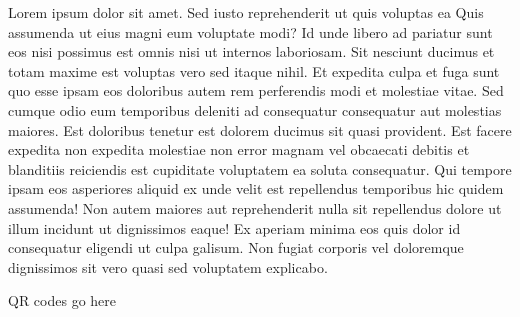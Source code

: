 \documentclass{article}%
\begin{document}
\vspace*{8pt}%
\linebreak%
\newline%
\newline%
Lorem ipsum dolor sit amet. Sed iusto reprehenderit ut quis voluptas ea Quis assumenda ut eius magni eum voluptate modi? Id unde libero ad pariatur sunt eos nisi possimus est omnis nisi ut internos laboriosam. Sit nesciunt ducimus et totam maxime est voluptas vero sed itaque nihil. Et expedita culpa et fuga sunt quo esse ipsam eos doloribus autem rem perferendis modi et molestiae vitae.\newline%
\newline%
Sed cumque odio eum temporibus deleniti ad consequatur consequatur aut molestias maiores. Est doloribus tenetur est dolorem ducimus sit quasi provident. Est facere expedita non expedita molestiae non error magnam vel obcaecati debitis et blanditiis reiciendis est cupiditate voluptatem ea soluta consequatur. Qui tempore ipsam eos asperiores aliquid ex unde velit est repellendus temporibus hic quidem assumenda!\newline%
\newline%
Non autem maiores aut reprehenderit nulla sit repellendus dolore ut illum incidunt ut dignissimos eaque! Ex aperiam minima eos quis dolor id consequatur eligendi ut culpa galisum. Non fugiat corporis vel doloremque dignissimos sit vero quasi sed voluptatem explicabo.\newline%
\newline%
%
\vspace*{30pt}%
\begin{center}%
\begin{Huge}%
QR codes go here%
\end{Huge}%
\end{center}%
\newpage%
\end{document}
